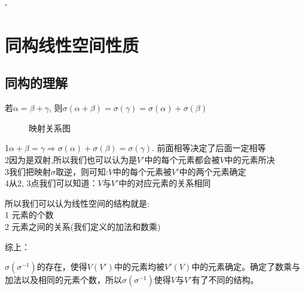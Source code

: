 -\section{同构线性空间性质}

\subsection{同构的理解}
若$\alpha = \beta + \gamma$, 则$\sigma(\alpha + \beta) = \sigma(\gamma) = \sigma(\alpha) + \sigma(\beta)$

\begin{figure}[!htb]
    \centering
    \caption{映射关系图}
    \label{映射关系图}
\end{figure}


\noindent\num{1}\quad  $\alpha+\beta=\gamma \Rightarrow \sigma(\alpha)+\sigma(\beta)=\sigma(\gamma)$.
前面相等决定了后面一定相等\\
\num{2}\quad 因为是双射,所以我们也可以认为是$V'$中的每个元素都会被$V$中的元素所决\\ 
\num{3}\quad 我们把映射$\sigma$取逆，则可知:$V$中的每个元素被$V'$中的两个元素确定\\ 
\num{4}\quad 从2, 3点我们可以知道：$V$与$V'$中的对应元素的关系相同\\    

\begin{corollary}[线性空间的结构]
   所以我们可以认为线性空间的结构就是:\\ 
   \num{1} 元素的个数\\ 
   \num{2} 元素之间的关系(我们定义的加法和数乘)
   
   综上：

$\sigma(\sigma^{-1})$的存在，使得$V(V')$中的元素均被$V'(V)$中的元素确定。确定了数乘与加法以及相同的元素个数，所以$\sigma (\sigma^{-1})$使得$V$与$V'$有了不同的结构。           
\end{corollary}


